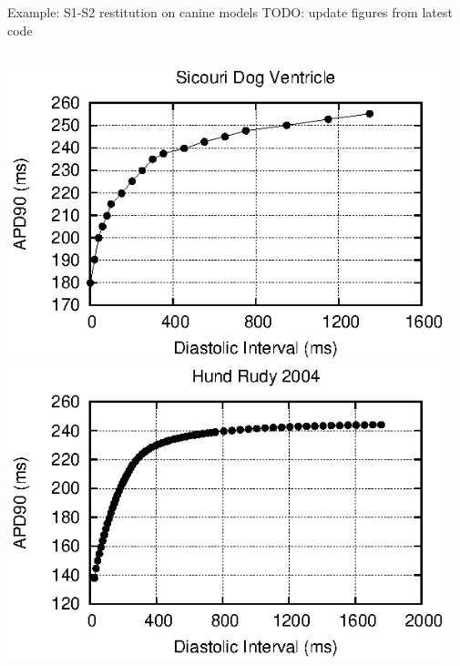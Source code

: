 \documentclass[t,xcolor={usenames,dvipsnames}]{beamer}
\begin{document}
\begin{frame}{Example: S1-S2 restitution on canine models}
TODO: update figures from latest code
\begin{columns}[T]
\begin{column}{.33\linewidth}
\begin{center}
\includegraphics[width=\textwidth]{sicouri_dog_ventricle_s1s2_curve}\\
\vspace{.1cm}
\includegraphics[width=\textwidth]{hund_rudy_2004_s1s2_curve}
\end{center}
\end{column}
\begin{column}{.33\linewidth}
\begin{center}

\end{center}
\end{column}
\end{columns}
\end{frame}
\end{document}
